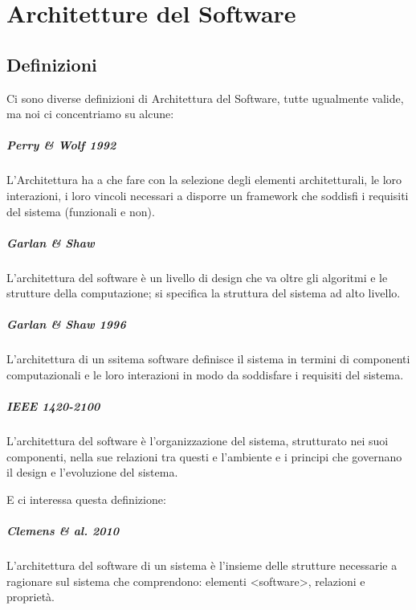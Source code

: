 \chapter{Architetture del Software}

\section{Definizioni}

Ci sono diverse definizioni di Architettura del Software, tutte ugualmente valide, ma noi ci concentriamo su alcune:

\paragraph{Perry \& Wolf 1992}
L'Architettura ha a che fare con la selezione degli elementi architetturali, le loro interazioni, i loro vincoli necessari a disporre un framework che soddisfi i requisiti del sistema (funzionali e non).

\paragraph{Garlan \& Shaw}
L'architettura del software \`e un livello di design che va oltre gli algoritmi e le strutture della computazione; si specifica la struttura del sistema ad alto livello.

\paragraph{Garlan \& Shaw 1996}
L'architettura di un ssitema software definisce il sistema in termini di componenti computazionali e le loro interazioni in modo da soddisfare i requisiti del sistema.

\paragraph{IEEE 1420-2100}
L'architettura del software \`e l'organizzazione del sistema, strutturato nei suoi componenti, nella sue relazioni tra questi e l'ambiente e i principi che governano il design e l'evoluzione del sistema.

E ci interessa questa definizione:

\paragraph{Clemens \& al. 2010}
L'architettura del software di un sistema \`e l'insieme delle strutture necessarie a ragionare sul sistema che comprendono: elementi <software>, relazioni e propriet\`a.

